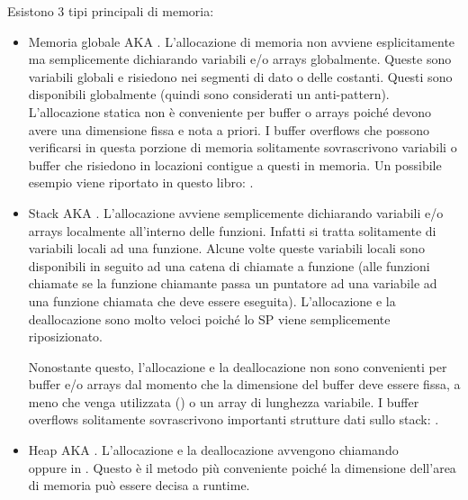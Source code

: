 ﻿

Esistono 3 tipi principali di memoria:

\begin{itemize}
\item
Memoria globale \ac{AKA} .
L'allocazione di memoria non avviene esplicitamente ma semplicemente dichiarando variabili e/o arrays globalmente.
Queste sono variabili globali e risiedono nei segmenti di dato o delle costanti.
Questi sono disponibili globalmente (quindi sono considerati un \gls{anti-pattern}). %
L'allocazione statica non è conveniente per buffer o arrays poiché devono avere una dimensione fissa e nota a priori.
I buffer overflows che possono verificarsi in questa porzione di memoria solitamente sovrascrivono variabili o buffer che risiedono in locazioni contigue a questi in memoria.
Un possibile esempio viene riportato in questo libro: .


\item
Stack \ac{AKA} .
L'allocazione avviene semplicemente dichiarando variabili e/o arrays localmente all'interno delle funzioni. Infatti si tratta solitamente di variabili locali ad una funzione.
Alcune volte queste variabili locali sono disponibili in seguito ad una catena di chiamate a funzione (alle funzioni \gls{chiamate} se la funzione chiamante passa un puntatore ad una variabile ad una funzione \gls{chiamata} che deve essere eseguita).
L'allocazione e la deallocazione sono molto veloci poiché lo \ac{SP} viene semplicemente riposizionato.


Nonostante questo, l'allocazione e la deallocazione non sono convenienti per buffer e/o arrays dal momento che la dimensione del buffer deve essere fissa, a meno che venga utilizzata  () o un array di lunghezza variabile.
I buffer overflows solitamente sovrascrivono importanti strutture dati sullo stack: .

\item
Heap \ac{AKA} .
L'allocazione e la deallocazione avvengono chiamando \\
 oppure  in \Cpp.
Questo è il metodo più conveniente poiché la dimensione dell'area di memoria può essere decisa a runtime.


\end{itemize}
